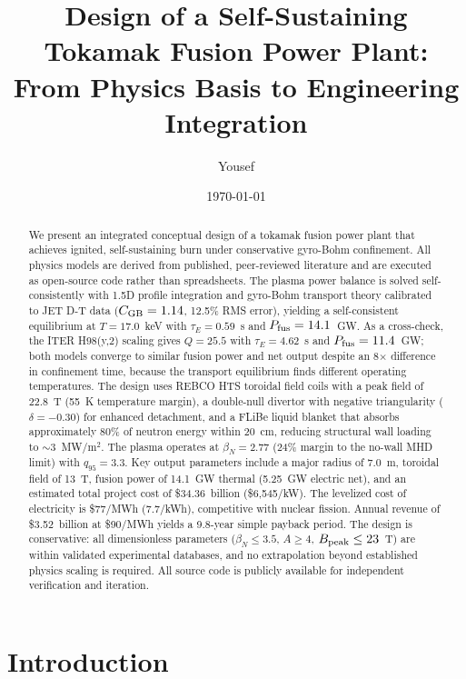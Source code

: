 \documentclass[11pt,a4paper]{article}
\title{Design of a Self-Sustaining Tokamak Fusion Power Plant:\\From Physics Basis to Engineering Integration}
\author{Yousef}
\affil{Independent Researcher}
\date{\today}
\begin{document}
\maketitle

\begin{abstract}
We present an integrated conceptual design of a tokamak fusion power plant that achieves ignited, self-sustaining burn under conservative gyro-Bohm confinement. All physics models are derived from published, peer-reviewed literature and are executed as open-source code rather than spreadsheets. The plasma power balance is solved self-consistently with 1.5D profile integration and gyro-Bohm transport theory calibrated to JET D-T data ($C_{\rm GB} = 1.14$, 12.5\% RMS error), yielding a self-consistent equilibrium at $T = 17.0$~keV with $\tau_E = 0.59$~s and $P_{\rm fus} = 14.1$~GW. As a cross-check, the ITER H98(y,2) scaling gives $Q = 25.5$ with $\tau_E = 4.62$~s and $P_{\rm fus} = 11.4$~GW; both models converge to similar fusion power and net output despite an 8$\times$ difference in confinement time, because the transport equilibrium finds different operating temperatures. The design uses REBCO HTS toroidal field coils with a peak field of 22.8~T (55~K temperature margin), a double-null divertor with negative triangularity ($\delta = -0.30$) for enhanced detachment, and a FLiBe liquid blanket that absorbs approximately 80\% of neutron energy within 20~cm, reducing structural wall loading to $\sim$3~MW/m$^2$. The plasma operates at $\beta_N = 2.77$ (24\% margin to the no-wall MHD limit) with $q_{95} = 3.3$. Key output parameters include a major radius of 7.0~m, toroidal field of 13~T, fusion power of 14.1~GW thermal (5.25~GW electric net), and an estimated total project cost of \$34.36~billion (\$6,545/kW). The levelized cost of electricity is \$77/MWh (7.7\cent/kWh), competitive with nuclear fission. Annual revenue of \$3.52~billion at \$90/MWh yields a 9.8-year simple payback period. The design is conservative: all dimensionless parameters ($\beta_N \leq 3.5$, $A \geq 4$, $B_{\rm peak} \leq 23$~T) are within validated experimental databases, and no extrapolation beyond established physics scaling is required. All source code is publicly available for independent verification and iteration.
\end{abstract}

\section{Introduction}
\end{document}
